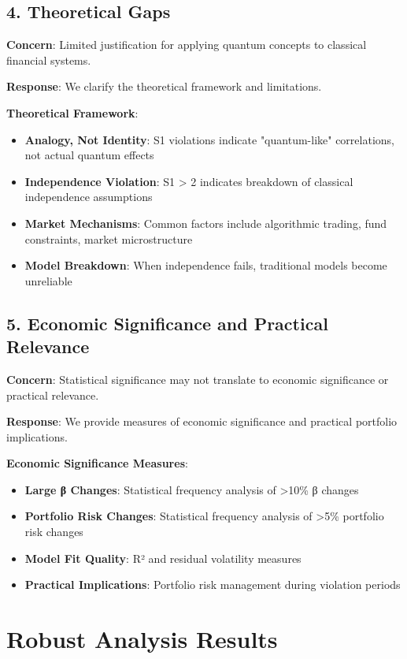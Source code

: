 \documentclass[11pt,a4paper]{article}
\begin{document}
\subsection{4. Theoretical Gaps}

\textbf{Concern}: Limited justification for applying quantum concepts to classical financial systems.

\textbf{Response}: We clarify the theoretical framework and limitations.

\textbf{Theoretical Framework}:
\begin{itemize}
\item \textbf{Analogy, Not Identity}: S1 violations indicate "quantum-like" correlations, not actual quantum effects
\item \textbf{Independence Violation}: S1 > 2 indicates breakdown of classical independence assumptions
\item \textbf{Market Mechanisms}: Common factors include algorithmic trading, fund constraints, market microstructure
\item \textbf{Model Breakdown}: When independence fails, traditional models become unreliable
\end{itemize}

\subsection{5. Economic Significance and Practical Relevance}

\textbf{Concern}: Statistical significance may not translate to economic significance or practical relevance.

\textbf{Response}: We provide measures of economic significance and practical portfolio implications.

\textbf{Economic Significance Measures}:
\begin{itemize}
\item \textbf{Large β Changes}: Statistical frequency analysis of >10\% β changes
\item \textbf{Portfolio Risk Changes}: Statistical frequency analysis of >5\% portfolio risk changes
\item \textbf{Model Fit Quality}: R² and residual volatility measures
\item \textbf{Practical Implications}: Portfolio risk management during violation periods
\end{itemize}

\section{Robust Analysis Results}
\end{document}
